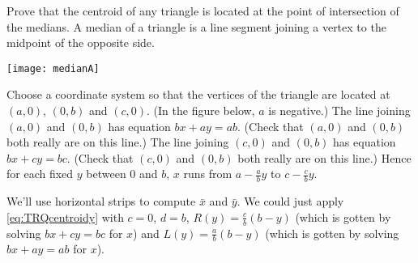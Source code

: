 \begin{eg}\label{eg:TRQcentroidC}
Prove that the centroid of any triangle
is located at the point of intersection of the medians.
A median of a triangle is a line segment joining a vertex
to the midpoint of the opposite side.

\begin{efig}
\begin{center}
    \texttt{[image: medianA]}
\end{center}
\end{efig}


\soln Choose a coordinate system so that the vertices of the triangle
are located at $(a,0)$, $(0,b)$ and $(c,0)$. (In the figure below,
$a$ is negative.)%
The line joining $(a,0)$ and $(0,b)$ has equation $bx+ay=ab$.
(Check that $(a,0)$ and $(0,b)$ both really are on this line.)
The line joining $(c,0)$ and $(0,b)$ has equation $bx+cy=bc$.
(Check that $(c,0)$ and $(0,b)$ both really are on this line.)
Hence for each fixed $y$ between $0$ and $b$, $x$ runs from
$a-\frac{a}{b}y$ to $c-\frac{c}{b}y$.


We'll use horizontal strips to compute $\bar x$ and $\bar y$. We could
just apply \eqref{eq:TRQcentroidy} with $c=0$, $d=b$,
$R(y)= \frac{c}{b}(b-y)$ (which is gotten by solving $bx+cy=bc$ for $x$) and
$L(y)= \frac{a}{b}(b-y)$ (which is gotten by solving $bx+ay=ab$ for $x$).


\end{eg}
